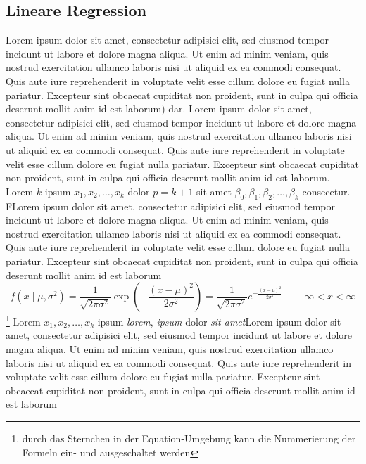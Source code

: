 \documentclass[12pt, a4paper, oneside]{article}
\begin{document}
\subsection{Lineare Regression}
Lorem ipsum dolor sit amet, consectetur adipisici elit, sed eiusmod tempor incidunt ut labore et dolore magna aliqua. Ut enim ad minim veniam, quis nostrud exercitation ullamco laboris nisi ut aliquid ex ea commodi consequat. Quis aute iure reprehenderit in voluptate velit esse cillum dolore eu fugiat nulla pariatur. Excepteur sint obcaecat cupiditat non proident, sunt in culpa qui officia deserunt mollit anim id est laborum\cite[S. 87]{woolridge2003introductory}) dar. Lorem ipsum dolor sit amet, consectetur adipisici elit, sed eiusmod tempor incidunt ut labore et dolore magna aliqua. Ut enim ad minim veniam, quis nostrud exercitation ullamco laboris nisi ut aliquid ex ea commodi consequat. Quis aute iure reprehenderit in voluptate velit esse cillum dolore eu fugiat nulla pariatur. Excepteur sint obcaecat cupiditat non proident, sunt in culpa qui officia deserunt mollit anim id est laborum.\cite[S. 103 ff.]{woolridge2003introductory} Lorem $k$ ipsum $x_1, x_2, \ldots, x_k$ dolor $p=k+1$ sit amet $\beta_0,\beta_1,\beta_2,\ldots, \beta_k$ consecetur.\cite[S. 71]{woolridge2003introductory} FLorem ipsum dolor sit amet, consectetur adipisici elit, sed eiusmod tempor incidunt ut labore et dolore magna aliqua. Ut enim ad minim veniam, quis nostrud exercitation ullamco laboris nisi ut aliquid ex ea commodi consequat. Quis aute iure reprehenderit in voluptate velit esse cillum dolore eu fugiat nulla pariatur. Excepteur sint obcaecat cupiditat non proident, sunt in culpa qui officia deserunt mollit anim id est laborum
%
\begin{equation*}
f(x \mid\mu,\sigma^2)=\frac{1}{\sqrt{2\pi\sigma^2}}\operatorname{exp}\left(-\frac{(x-\mu)^2}{2\sigma^2}\right)=\frac{1}{\sqrt{2\pi\sigma^2}} e^{-\frac{(x-\mu)^2}{2\sigma^2}}\quad -\infty<x<\infty
 \end{equation*}\footnote{durch das Sternchen in der Equation-Umgebung kann die Nummerierung der Formeln ein- und ausgeschaltet werden}
%
Lorem $x_1, x_2, \ldots, x_k$ ipsum \emph{lorem}, \emph{ipsum} dolor \emph{sit amet}Lorem ipsum dolor sit amet, consectetur adipisici elit, sed eiusmod tempor incidunt ut labore et dolore magna aliqua. Ut enim ad minim veniam, quis nostrud exercitation ullamco laboris nisi ut aliquid ex ea commodi consequat. Quis aute iure reprehenderit in voluptate velit esse cillum dolore eu fugiat nulla pariatur. Excepteur sint obcaecat cupiditat non proident, sunt in culpa qui officia deserunt mollit anim id est laborum\cite[S. 453]{fahrmeir2016statistik}
\end{document}
